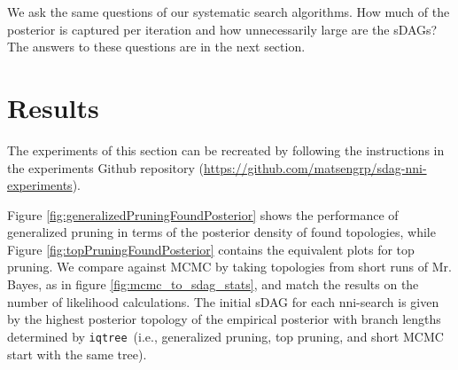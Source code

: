 \documentclass{article}
\newcommand{\iqtree}{\texttt{iqtree}}
\begin{document}
We ask the same questions of our systematic search algorithms. How much of the posterior is captured per iteration and how unnecessarily large are the sDAGs? The answers to these questions are in the next section. 


\section{Results}

The experiments of this section can be recreated by following the instructions in the experiments Github repository (\url{https://github.com/matsengrp/sdag-nni-experiments}).

Figure \ref{fig:generalizedPruningFoundPosterior} shows the performance of generalized pruning in terms of the posterior density of found topologies,
while Figure \ref{fig:topPruningFoundPosterior} contains the equivalent plots for top pruning.
We compare against MCMC by taking topologies from short runs of Mr. Bayes, as in figure \ref{fig:mcmc_to_sdag_stats}, and match the results on the number of likelihood calculations.
The initial sDAG for each nni-search is given by the highest posterior topology of the empirical posterior with branch lengths determined by \iqtree\, (i.e., generalized pruning, top pruning, and short MCMC start with the same tree).
\end{document}
